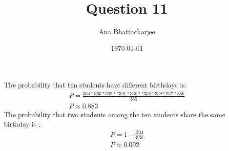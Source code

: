 \documentclass{article}
\begin{document}
\title{Question 11}
\author{Ana Bhattacharjee}
\date{\today}
\maketitle

\begin{center}
The probability that ten students have different birthdays is:
  \begin{align}
    P = \frac{364 * 363 * 362 * * 361 * 360 * * 359 * 358 * 357 * 356}{365} \\
    P \approx 0.883
  \end{align}
The probability that two students among the ten students share the same birthday is :
  \begin{align}
    P = 1 - \frac{364}{365} \\
    P \approx 0.002 
  \end{align}
\end{center}
\end{document}
